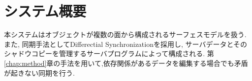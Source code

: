 \chapter{システム概要}
本システムはオブジェクトが複数の面から構成されるサーフェスモデルを扱う. また, 同期手法としてDifferectial Synchronizationを採用し, サーバデータとそのシャドウコピーを管理するサーバプログラムによって構成される.
第\ref{chap:method}章の手法を用いて,依存関係があるデータを編集する場合でも矛盾が起きない同期を行う.  
